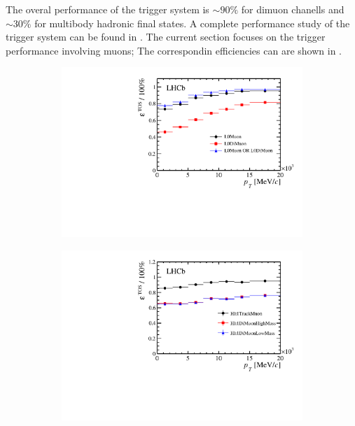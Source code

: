 The overal performance of the \lhcb trigger system is $\sim 90\%$ for dimuon chanells and $\sim 30\%$ for
multibody hadronic final states. A complete performance study of the trigger system can be found in \cite{}.
The current section focuses on the trigger performance involving muons; The correspondin efficiencies can
are shown in \figref{}.


\begin{figure}[t]
  \centering
  \begin{subfigure}{0.5\textwidth}
    \raggedright
    \includegraphics[width=\textwidth,trim=0.45cm 0cm 0.4cm 0cm, clip=true]{Figures/Chapter2/l0_muon_eff}
    \caption{}
    \label{det_run_one_l0_muon_line_eff}
  \end{subfigure}%
  \begin{subfigure}{0.5\textwidth}
    \raggedleft
    \includegraphics[width=\textwidth,trim=0.45cm 0cm 0.4cm 0cm, clip=true]{Figures/Chapter2/hlt1_muon_eff}

\end{subfigure}
\end{figure}
